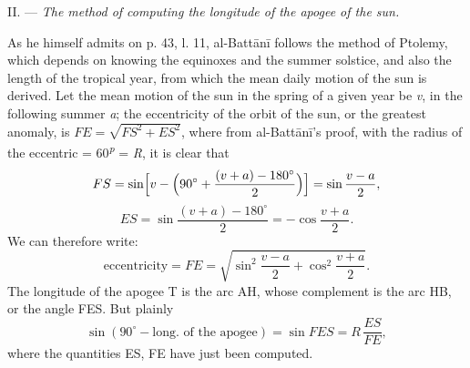 \documentclass[11pt]{article}
\begin{document}
\par II. — \emph{The method of computing the longitude of the apogee of the sun.}\par
\par As he himself admits on p. 43, l. 11, al-Battānī follows the method of Ptolemy, which depends on knowing the equinoxes and the summer solstice, and also the length of the tropical year, from which the mean daily motion of the sun is derived. Let the mean motion of the sun in the spring of a given year be \emph{v}, in the following summer \emph{a}; the eccentricity of the orbit of the sun, or the greatest anomaly, is $FE = \sqrt{FS^2 + ES^2}$, where from al-Battānī's proof, with the radius of the eccentric = 60\textsuperscript{\itshape p} = \emph{R}, it is clear that \[ FS = \sin\Bigl[v - \Bigl(90^\circ + \frac{(v + a) - 180^\circ}{2}\Bigr)\Bigr] = \sin\frac{v - a}{2}, \] \[ ES = \sin\frac{(v + a) - 180^\circ}{2} = -\cos\frac{v + a}{2}. \] We can therefore write: \[ \text{eccentricity} = FE = \sqrt{\sin^2\frac{v - a}{2} + \cos^2\frac{v + a}{2}}. \] The longitude of the apogee T is the arc AH, whose complement is the arc HB, or the angle FES. But plainly \[ \sin(90^\circ - \text{long. of the apogee}) = \sin FES = R\,\frac{ES}{FE}, \] where the quantities ES, FE have just been computed.\par
\end{document}
